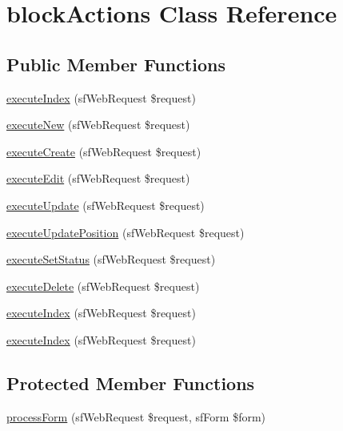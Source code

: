 \hypertarget{classblock_actions}{\section{block\-Actions Class Reference}
\label{classblock_actions}
}
\subsection*{Public Member Functions}
\begin{DoxyCompactItemize}
\item 
\hyperlink{classblock_actions_a948cc911eb1d9f77990be54af3b2080f}{execute\-Index} (sf\-Web\-Request \$request)
\item 
\hyperlink{classblock_actions_a0ffbea56560c6c633dae68ec22aff21c}{execute\-New} (sf\-Web\-Request \$request)
\item 
\hyperlink{classblock_actions_a75837617743fb64dca82d8133b2c662a}{execute\-Create} (sf\-Web\-Request \$request)
\item 
\hyperlink{classblock_actions_af4d8fedd4b28f3398826a1bb8fa54394}{execute\-Edit} (sf\-Web\-Request \$request)
\item 
\hyperlink{classblock_actions_af7b4f51862add3c2ebb54efc136a0840}{execute\-Update} (sf\-Web\-Request \$request)
\item 
\hyperlink{classblock_actions_acae2fa1cffde05d8c0331ca062d5ee54}{execute\-Update\-Position} (sf\-Web\-Request \$request)
\item 
\hyperlink{classblock_actions_a365ffe9a4c547cdb81d9e2131e7bd7b9}{execute\-Set\-Status} (sf\-Web\-Request \$request)
\item 
\hyperlink{classblock_actions_a52b5b11b11a0070dd2662257520c045a}{execute\-Delete} (sf\-Web\-Request \$request)
\item 
\hyperlink{classblock_actions_a948cc911eb1d9f77990be54af3b2080f}{execute\-Index} (sf\-Web\-Request \$request)
\item 
\hyperlink{classblock_actions_a948cc911eb1d9f77990be54af3b2080f}{execute\-Index} (sf\-Web\-Request \$request)
\end{DoxyCompactItemize}
\subsection*{Protected Member Functions}
\begin{DoxyCompactItemize}
\item 
\hyperlink{classblock_actions_a7cf661d837626e0320753cbffa019a01}{process\-Form} (sf\-Web\-Request \$request, sf\-Form \$form)
\end{DoxyCompactItemize}


